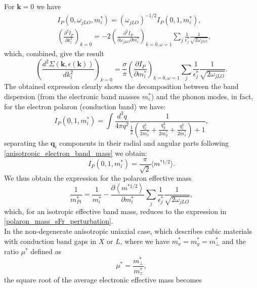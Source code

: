For $\mathbf{k}=0$ we have \cite{guster2021frohlich}
\begin{equation}
\begin{split}
    &I_P(0,\omega_{jLO},m^*_i)=(\omega_{jLO})^{-1/2}I_P(0,1,m^*_i),\\
    &\left(\frac{\partial^2I_P}{\partial k_i^2}\right)_{k=0}=-2\left(\frac{\partial^2I_P}{\partial \omega_{jLO}\partial m^*_i}\right)_{k=0,\omega=1}\sum_j\frac{1}{\epsilon^*_j}\frac{1}{\sqrt{2\omega_{jLO}}},
\end{split}
\end{equation}
which, combined, give the result
\begin{equation}
    \left(\frac{d^2\Sigma(\mathbf{k},\epsilon(\mathbf{k}))}{dk^2_i}\right)_{k=0}=\frac{\sigma}{\pi}\left(\frac{\partial I_P}{\partial m^*_i}\right)_{k=0,\omega=1}\sum_j\frac{1}{\epsilon^*_j}\frac{1}{\sqrt{2\omega_{jLO}}}.
\end{equation}
The obtained expression clearly shows the decomposition between the band dispersion (from the electronic band masses $m^*_i$) and the 
phonon modes, in fact, for the electron polaron (conduction band) we have:
\begin{equation}
    I_P(0,1,m^*_i)=\int\frac{d^3q}{4\pi q^2}\frac{1}{\frac{1}{2}\left(\frac{q_x^2}{2m_x^*}+\frac{q_y^2}{2m_y^*}+\frac{q_z^2}{2m^*_z}\right)+1},
\end{equation}
separating the $\mathbf{q}_i$ components in their radial and angular parts following \ref{anisotropic_electron_band_mass} we obtain:
\begin{equation}
    I_P(0,1,m^*_i)=\frac{\pi}{\sqrt{2}}\langle m^{*1/2}\rangle.
\end{equation}
We thus obtain the expression for the polaron effective mass
\begin{equation}
    \frac{1}{m^*_{Pi}}=\frac{1}{m_i^*}-\frac{\partial \left\langle m^{*1/2}\right \rangle}{\partial m^*_i}\sum_j\frac{1}{\epsilon^*_j}\frac{1}{\sqrt{2\omega_{jLO}}},
\end{equation}
which, for an isotropic effective band mass, reduces to the expression in \ref{polaron_mass_sFr_perturbation}.\\
In the non-degenerate anisotropic uniaxial case, which describes cubic materials with conduction band gaps in $X$ or $L$, where we 
have $m^*_x=m^*_y=m^*_\perp$ and the ratio $\mu^*$ defined as 
\begin{equation}
    \mu^*=\frac{m^*_\perp}{m^*_z},
\end{equation}
the square root of the average electronic effective mass becomes 
